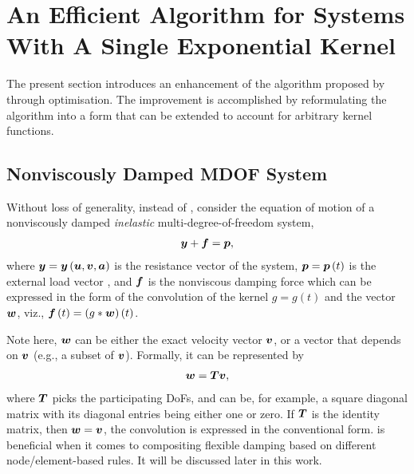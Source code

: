\section{An Efficient Algorithm for Systems With A Single Exponential Kernel}\label{sec:single}
The present section introduces an enhancement of the algorithm proposed by \citet{Adhikari2004} through optimisation. The improvement is accomplished by reformulating the algorithm into a form that can be extended to account for arbitrary kernel functions.
\subsection{Nonviscously Damped MDOF System}
Without loss of generality, instead of , consider the equation of motion of a nonviscously damped \textit{inelastic} multi-degree-of-freedom system,
\begin{gather}\label{eq:eom}
\bm{y}+\bm{f}=\bm{p},
\end{gather}
where $\bm{y}=\bm{y}\left(\bm{u},\bm{v},\bm{a}\right)$ is the resistance vector of the system, $\bm{p}=\bm{p}\left(t\right)$ is the external load vector , and $\bm{f}$ is the nonviscous damping force which can be expressed in the form of the convolution of the kernel $g=g\left(t\right)$ and the vector $\bm{w}$, viz., $\bm{f}\left(t\right)=\left(g*\bm{w}\right)\left(t\right)$.

Note here, $\bm{w}$ can be either the exact velocity vector $\bm{v}$, or a vector that depends on $\bm{v}$ (e.g., a subset of $\bm{v}$). Formally, it can be represented by
\begin{gather}\label{eq:wv}
\bm{w}=\bm{T}\bm{v},
\end{gather}
where $\bm{T}$ picks the participating DoFs, and can be, for example, a square diagonal matrix with its diagonal entries being either one or zero. If $\bm{T}$ is the identity matrix, then $\bm{w}=\bm{v}$, the convolution is expressed in the conventional form.  is beneficial when it comes to compositing flexible damping based on different node/element-based rules. It will be discussed later in this work.
